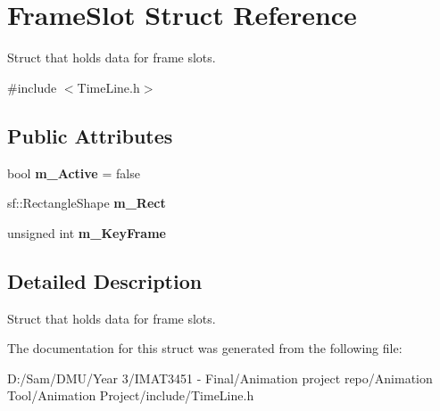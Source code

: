 \hypertarget{struct_frame_slot}{}\section{Frame\+Slot Struct Reference}
\label{struct_frame_slot}


Struct that holds data for frame slots.  




{\ttfamily \#include $<$Time\+Line.\+h$>$}

\subsection*{Public Attributes}
\begin{DoxyCompactItemize}
\item 
\mbox{\label{struct_frame_slot_a875d2212f5563c740c4b62877b1b3202}} 
bool {\bfseries m\+\_\+\+Active} = false
\item 
\mbox{\label{struct_frame_slot_a82ba39808f3cfc7a0b81d15369fc1c5e}} 
sf\+::\+Rectangle\+Shape {\bfseries m\+\_\+\+Rect}
\item 
\mbox{\label{struct_frame_slot_a1d57d7133707bafbdd9293fe7019d19b}} 
unsigned int {\bfseries m\+\_\+\+Key\+Frame}
\end{DoxyCompactItemize}


\subsection{Detailed Description}
Struct that holds data for frame slots. 

The documentation for this struct was generated from the following file\+:\begin{DoxyCompactItemize}
\item 
D\+:/\+Sam/\+D\+M\+U/\+Year 3/\+I\+M\+A\+T3451 -\/ Final/\+Animation project repo/\+Animation Tool/\+Animation Project/include/Time\+Line.\+h\end{DoxyCompactItemize}

